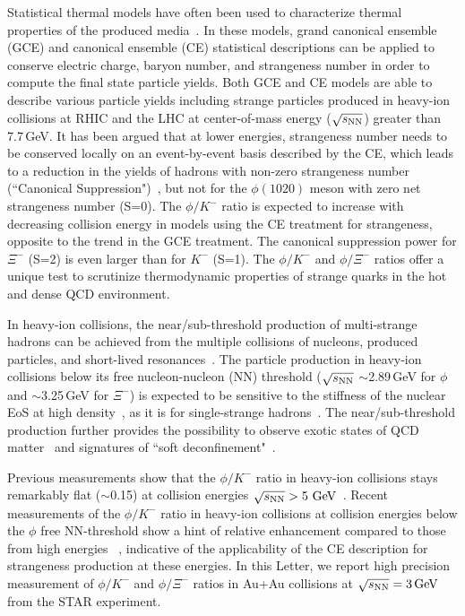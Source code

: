\documentclass[aps,tightenlines,superscriptaddress,twocolumn]{revtex4-1}
\begin{document}
Statistical thermal models have often been used to characterize thermal properties of the produced media~\cite{Andronic_2018Naure,Rafelski_1980279,Cleymans:1992zc,Becattini:1997ii,Florkowski:2001fp,Redlich_CE,Rafelski_PRC}. In these models, grand canonical ensemble (GCE) and canonical ensemble (CE) statistical descriptions can be applied to conserve electric charge, baryon number, and strangeness number in order to compute the final state particle yields. Both GCE and CE models are able to describe various particle yields including strange particles produced in heavy-ion collisions at RHIC and the LHC at center-of-mass energy ($\sqrt{s_{\rm NN}}$) greater than 7.7\,GeV. It has been argued that at lower energies, strangeness number needs to be conserved locally on an event-by-event basis described by the CE, which leads to a reduction in the yields of hadrons with non-zero strangeness number (``Canonical Suppression")~\cite{Rafelski_1980279,Rafelski_2002,Redlich:2001kb}, but not for the $\phi(1020)$ meson with zero net strangeness number (S=0). The $\phi/K^-$ ratio is expected to increase with decreasing collision energy in models using the CE treatment for strangeness, opposite to the trend in the GCE treatment. The canonical suppression power for $\Xi^-$ (S=2) is even larger than for $K^-$ (S=1). The $\phi/K^-$ and $\phi/\Xi^-$ ratios offer a unique test to scrutinize thermodynamic properties of strange quarks in the hot and dense QCD environment.


In heavy-ion collisions, the near/sub-threshold production of multi-strange hadrons can be achieved from the multiple collisions of nucleons, produced particles, and short-lived resonances~\cite{ZEEB2004297}. The particle production in heavy-ion collisions below its free nucleon-nucleon (NN) threshold ($\sqrt{s_{\rm NN}}$ $\sim$2.89\,GeV for $\phi$ and $\sim$3.25\,GeV for $\Xi^-$) is expected to be sensitive to the stiffness of the nuclear EoS at high density~\cite{yong2021double}, as it is for single-strange hadrons~\cite{KO.PhysRevLett.55.2661,FUCHS20061_kaons}. The near/sub-threshold production further provides the possibility
to observe exotic states of QCD matter~\cite{McLerran:2007qj} and signatures of ``soft deconfinement"~\cite{Fukushima:2020cmk}.
 
Previous measurements 
show that the $\phi/K^-$ ratio in heavy-ion collisions stays remarkably flat ($\sim$0.15) at collision energies ${\sqrt{s_{\rm NN}} > \textup{5 GeV}}$~\cite{E917_phi,NA49_phi,star_bes_strangeness}. Recent measurements of the $\phi/K^-$ ratio in heavy-ion collisions at collision energies below the $\phi$ free NN-threshold %
show a hint of relative enhancement compared to those from high energies
~\cite{FOPI_phi_AlAl,FOPI_phi_NiNi,HADES_phi_ArKCl,HADES_phi_AuAu}, indicative of the applicability of the CE description for strangeness production at these energies. In this Letter, we report high precision measurement of $\phi/K^-$ and $\phi/\Xi^-$ ratios in Au+Au collisions at ${\sqrt{s_{\rm NN}} = \rm{3\,GeV}}$ from the STAR experiment.
\end{document}
